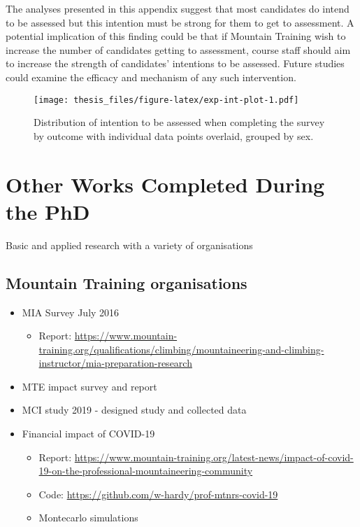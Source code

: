 \documentclass[
  12pt,
  a4paper,
]{book}
\providecommand{\tightlist}{%
  \setlength{\itemsep}{0pt}\setlength{\parskip}{0pt}}
\begin{document}
The analyses presented in this appendix suggest that most candidates do intend to be assessed but this intention must be strong for them to get to assessment. A potential implication of this finding could be that if Mountain Training wish to increase the number of candidates getting to assessment, course staff should aim to increase the strength of candidates' intentions to be assessed. Future studies could examine the efficacy and mechanism of any such intervention.

\begin{figure}
\centering
\texttt{[image: thesis\_files/figure-latex/exp-int-plot-1.pdf]}
\caption{\label{fig:exp-int-plot}Distribution of intention to be assessed when completing the survey by outcome with individual data points overlaid, grouped by sex.}
\end{figure}

\hypertarget{other-works}{%
\chapter{Other Works Completed During the PhD}\label{other-works}}

Basic and applied research with a variety of organisations

\hypertarget{mountain-training-organisations}{%
\section{Mountain Training organisations}\label{mountain-training-organisations}}

\begin{itemize}
\tightlist
\item
  MIA Survey July 2016

  \begin{itemize}
  \tightlist
  \item
    Report: \url{https://www.mountain-training.org/qualifications/climbing/mountaineering-and-climbing-instructor/mia-preparation-research}
  \end{itemize}
\item
  MTE impact survey and report
\item
  MCI study 2019 - designed study and collected data
\item
  Financial impact of COVID-19

  \begin{itemize}
  \tightlist
  \item
    Report: \url{https://www.mountain-training.org/latest-news/impact-of-covid-19-on-the-professional-mountaineering-community}
  \item
    Code: \url{https://github.com/w-hardy/prof-mtnrs-covid-19}
  \item
    Montecarlo simulations
  \end{itemize}
\end{itemize}
\end{document}

